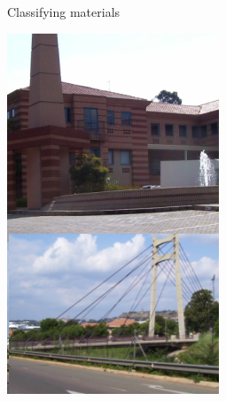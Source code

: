 \begin{activity}{Classifying materials}
{\begin{minipage}{.25\textwidth}
\begin{center}
 \includegraphics[height=.8\textwidth]{photos/materials.png}
\end{center}
\end{minipage}
}
\end{activity}


\label{m38708*cid2}
